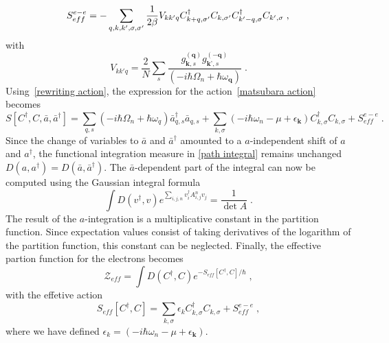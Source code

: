 \documentclass{article}
\begin{document}
\begin{equation}
    S^{e-e}_{eff} = -\sum_{q,k,k',\sigma,\sigma'} \frac{1}{2 \beta} V_{k k' q}
      C^{\dagger}_{k + q,\sigma'}C_{k,\sigma'} C^{\dagger}_{k' - q,\sigma}C_{k',\sigma}\;,\nonumber \\
    \label{effective hamiltonian}
\end{equation}
with
\begin{equation}
V_{k k' q} = \frac{2}{N} \sum_s \frac{g_{\textbf{k},s}^{(\textbf{q})} g_{\textbf{k'},s}^{(-\textbf{q})}  }{\left(-i\hbar\Omega_n + \hbar \omega_{\textbf{q}}\right)}\;.
\end{equation}
Using~\cref{rewriting action}, the expression for the action~\cref{matsubara action} becomes
\begin{equation}
     S[C^{\dagger},C,\bar{a},\bar{a}^{\dagger}] = \sum_{q,s} \left(-i\hbar\Omega_n + \hbar \omega_{q}\right)  \bar{a}^{\dagger}_{q,s}\bar{a}_{q,s} + \sum_{k,\sigma} \left(-i\hbar\omega_n - \mu + \epsilon_{\textbf{k}}\right) C^{\dagger}_{k,\sigma} C_{k,\sigma} +  S^{e-e}_{eff} \;.
     \label{action shifted coordinates}
\end{equation}
Since the change of variables to $\bar{a}$ and $\bar{a}^{\dagger}$ amounted to a $a$-independent shift of $a$ and $a^{\dagger}$, the functional integration measure in \cref{path integral} remains unchanged $D(a,a^{\dagger}) = D(\bar{a},\bar{a}^{\dagger})$. 
The $\bar{a}$-dependent part of the integral can now be computed using the Gaussian integral formula~\cite{Altland}
\begin{equation}
    \int D(v^{\dagger},v) e^{\sum_{i,j,n} v_i^{\dagger} A_{i,j}^{n} v_j} = \frac{1}{\det{A}} \;.
    \label{gaussian integral}
\end{equation}
The result of the ${a}$-integration is a multiplicative constant in the partition function. Since expectation values consist of taking derivatives of the logarithm of the partition function, this constant can be neglected. Finally, the effective partion function for the electrons becomes
\begin{equation}
    \mathcal{Z}_{eff} = \int D(C^{\dagger}, C) e^{-S_{eff}[C^{\dagger},C] / \hbar}\;,
    \label{effective partion function}
\end{equation} 
with the effetive action
\begin{equation}
    S_{eff}[C^{\dagger},C] = \sum_{k,\sigma} \epsilon_k C^{\dagger}_{k,\sigma} C_{k,\sigma} +  S^{e-e}_{eff} \;,
    \label{effective action}
\end{equation}
where we have defined $\epsilon_k = \left(-i\hbar\omega_n - \mu + \epsilon_{\textbf{k}}\right)$.
\end{document}
